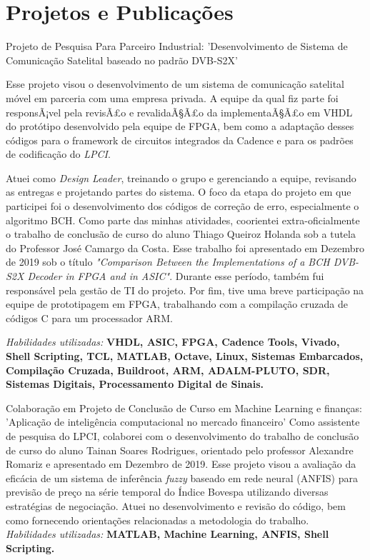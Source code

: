 \documentclass[a4paper]{twentysecondcv} %
\begin{document}
\section{Projetos e Publicações}
\begin{twenty}
\twentyitem
{Projeto de Pesquisa Para Parceiro Industrial:}
{'Desenvolvimento de Sistema de Comunicação Satelital baseado no padrão DVB-S2X'}
{}
{\hspace{8pt} Esse projeto visou o desenvolvimento de um sistema de comunicação
satelital móvel em parceria com uma empresa privada. A equipe da qual fiz parte 
foi responsÃ¡vel pela revisÃ£o e revalidaÃ§Ã£o da implementaÃ§Ã£o em VHDL do 
protótipo desenvolvido pela equipe de FPGA, bem como a adaptação desses códigos 
para o framework de circuitos integrados da Cadence e para os padrões de 
codificação do \textit{LPCI}. 

\hspace{8pt}Atuei como \textit{Design Leader}, treinando o grupo e gerenciando a 
equipe, revisando as entregas e projetando partes do sistema. O foco da etapa do 
projeto em que participei foi o desenvolvimento dos códigos de correção de erro, 
especialmente o algoritmo BCH. Como parte das minhas atividades, coorientei 
extra-oficialmente o trabalho de conclusão de curso do aluno Thiago Queiroz 
Holanda sob a tutela do Professor José Camargo da Costa. Esse trabalho foi 
apresentado em Dezembro de 2019 sob o título \textit{"Comparison Between the 
Implementations of a BCH DVB-S2X Decoder in FPGA and in ASIC"}. Durante esse 
período, também fui responsável pela gestão de TI do projeto. Por fim, tive uma 
breve participação na equipe de prototipagem em FPGA, trabalhando com a 
compilação cruzada de códigos C para um processador ARM.

\hspace{8pt}\textit{Habilidades utilizadas:} \textbf{VHDL, ASIC, FPGA, Cadence 
Tools, Vivado, Shell Scripting, TCL, MATLAB, Octave, Linux, Sistemas Embarcados, 
Compilação Cruzada, Buildroot, ARM, ADALM-PLUTO, SDR, Sistemas Digitais, 
Processamento Digital de Sinais.\\}}


\twentyitem
{Colaboração em Projeto de Conclusão de Curso em Machine Learning e finanças:}
{'Aplicação de inteligência computacional no mercado financeiro'}
{}
{\hspace{8pt} Como assistente de pesquisa do LPCI, colaborei com o desenvolvimento
do trabalho de conclusão de curso do aluno Tainan Soares Rodrigues, orientado pelo
professor Alexandre Romariz e apresentado em Dezembro de 2019. Esse projeto visou 
a avaliação da eficácia de um sistema de inferência \textit{fuzzy} baseado em rede
neural (ANFIS) para previsão de preço na série temporal do Índice Bovespa 
utilizando diversas estratégias de negociação. Atuei no desenvolvimento e revisão
do código, bem como fornecendo orientações relacionadas a metodologia do trabalho.
\\
\textit{Habilidades utilizadas:} \textbf{MATLAB, Machine Learning, ANFIS, 
Shell Scripting.\\}}


\end{twenty}
\end{document}

